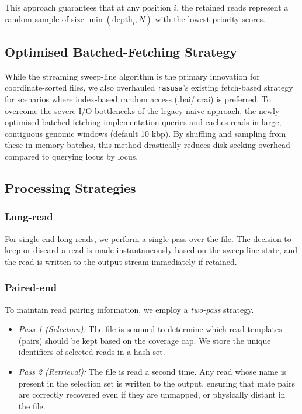 \documentclass[a4paper,num-refs,gigabyte]{oup-contemporary}
\begin{document}
This approach guarantees that at any position $i$, the retained reads represent a random sample of size $\min(\text{depth}_i, N)$ with the lowest priority scores.

\subsection{Optimised Batched-Fetching Strategy}\label{sec:optimise}
While the streaming sweep-line algorithm is the primary innovation for coordinate-sorted files, we also overhauled \texttt{rasusa}'s existing fetch-based strategy for scenarios where index-based random access (.bai/.crai) is preferred. To overcome the severe I/O bottlenecks of the legacy naive approach, the newly optimised batched-fetching implementation queries and caches reads in large, contiguous genomic windows (default 10 kbp). By shuffling and sampling from these in-memory batches, this method drastically reduces disk-seeking overhead compared to querying locus by locus.

\subsection{Processing Strategies}

\subsubsection{Long-read} 
For single-end long reads, we perform a single pass over the file. The decision to keep or discard a read is made instantaneously based on the sweep-line state, and the read is written to the output stream immediately if retained.

\subsubsection{Paired-end} 
To maintain read pairing information, we employ a \textit{two-pass} strategy.
\begin{itemize}
    \item \textit{Pass 1 (Selection):} The file is scanned to determine which read templates (pairs) should be kept based on the coverage cap. We store the unique identifiers of selected reads in a hash set.
    \item \textit{Pass 2 (Retrieval):} The file is read a second time. Any read whose name is present in the selection set is written to the output, ensuring that mate pairs are correctly recovered even if they are unmapped, or physically distant in the file.
\end{itemize}
\end{document}
